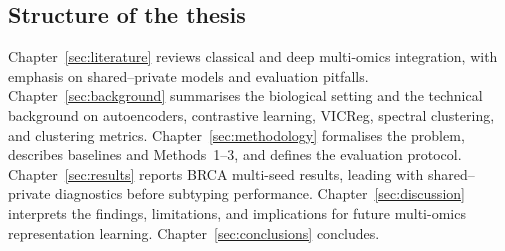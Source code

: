 \subsection{Structure of the thesis}

Chapter~\ref{sec:literature} reviews classical and deep multi-omics integration, with emphasis on shared--private models and evaluation pitfalls. Chapter~\ref{sec:background} summarises the biological setting and the technical background on autoencoders, contrastive learning, VICReg, spectral clustering, and clustering metrics. Chapter~\ref{sec:methodology} formalises the problem, describes baselines and Methods~1--3, and defines the evaluation protocol. Chapter~\ref{sec:results} reports BRCA multi-seed results, leading with shared--private diagnostics before subtyping performance. Chapter~\ref{sec:discussion} interprets the findings, limitations, and implications for future multi-omics representation learning. Chapter~\ref{sec:conclusions} concludes.
